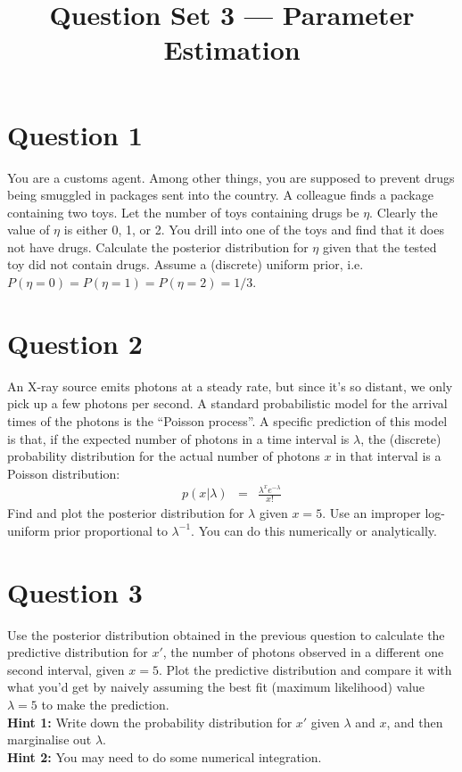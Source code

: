 \documentclass[a4paper, 12pt]{article}
\title{Question Set 3 --- Parameter Estimation}
\author{}
\date{}
\begin{document}
\maketitle


\setlength{\parindent}{0pt}
\setlength{\parskip}{8pt}

\section*{Question 1}
You are a customs agent. Among other things, you are supposed to prevent
drugs being smuggled in packages sent into the country. A colleague finds a
package containing two toys. Let the number of toys containing drugs be
$\eta$. Clearly the value of $\eta$ is either 0, 1, or 2. You drill into
one of the toys and find that it does not have drugs.
Calculate the posterior distribution for $\eta$ given that the tested
toy did not contain drugs. Assume a (discrete) uniform prior, i.e.
$P(\eta=0) = P(\eta=1) = P(\eta=2) = 1/3$.

\section*{Question 2}
An X-ray source emits photons at a steady rate, but since it's so distant, we
only pick up a few photons per second.
A standard probabilistic model for the arrival times of the photons is the
``Poisson process''. A specific prediction of this model is that, if the
expected number of photons in a time interval
is $\lambda$, the (discrete) probability distribution for the actual number of photons $x$ in that interval is a Poisson distribution:
\begin{eqnarray}
p(x | \lambda) &=& \frac{\lambda^x e^{-\lambda}}{x!}
\end{eqnarray}
Find and plot the posterior distribution for $\lambda$ given $x=5$. Use an improper
log-uniform prior proportional to $\lambda^{-1}$. You can do this numerically or
analytically.

\section*{Question 3}
Use the posterior distribution obtained in the previous question to calculate
the predictive distribution for $x'$, the number of photons observed in a
different one second interval, given $x=5$. Plot the predictive distribution
and compare it with what you'd get by naively assuming the best fit
(maximum likelihood) value $\lambda=5$ to make the prediction.\\

{\bf Hint 1: }Write down the probability distribution for $x'$ given
$\lambda$ and $x$, and then marginalise out $\lambda$.\\

{\bf Hint 2: }You may need to do some numerical integration.
\end{document}
